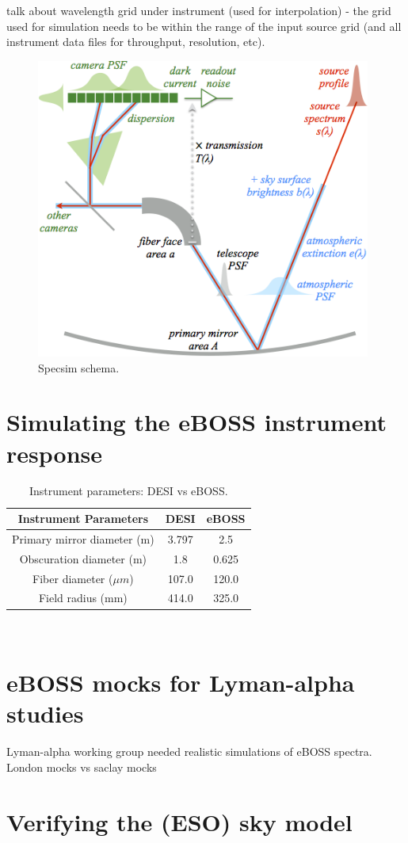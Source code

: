 talk about wavelength grid under instrument (used for interpolation) - the grid used for simulation needs to be within the range of the input source grid (and all instrument data files for throughput, resolution, etc).  

\begin{figure}
\centering
\includegraphics[width=11cm]{images/specsim/overview.png}
\caption{Specsim schema.}
\label{fig:overview}
\end{figure}

\section{Simulating the eBOSS instrument response}

\begin{table}
\caption{Instrument parameters: DESI vs eBOSS.}
\label{tab:comparison}
\centering
\begin{tabular}{|c|c|c|}
  \hline
  Instrument Parameters & DESI & eBOSS\\
  \hline \hline
  Primary mirror diameter (m) & 3.797 & 2.5 \\
  \hline
  Obscuration diameter (m) & 1.8 & 0.625 \\
  \hline
  Fiber diameter ($\mu m$) & 107.0 & 120.0 \\
  \hline
  Field radius (mm) & 414.0 & 325.0 \\
  \hline
\end{tabular}
\end{table}\\


\section{eBOSS mocks for Lyman-alpha studies}

Lyman-alpha working group needed realistic simulations of eBOSS spectra. London mocks vs saclay mocks

\section{Verifying the (ESO) sky model}



